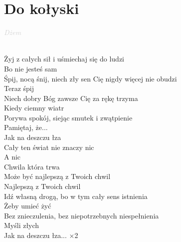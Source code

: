 \documentclass[a5paper, 10pt]{book}
\begin{document}
\section{Do kołyski}\textcolor{lightgray}{\textit{Dżem}}\\~\\
\begin{minipage}[t]{0.7\textwidth}
  Żyj z całych sił i uśmiechaj się do ludzi\\
  Bo nie jesteś sam\\
  Śpij, nocą śnij, niech zły sen Cię nigdy więcej nie obudzi\\
  Teraz śpij\\

  Niech dobry Bóg zawsze Cię za rękę trzyma\\
  Kiedy ciemny wiatr\\
  Porywa spokój, siejąc smutek i zwątpienie\\
  Pamiętaj, że...\\

  \hspace*{5mm}Jak na deszczu łza\\
  \hspace*{5mm}Cały ten świat nie znaczy nic\\
  \hspace*{5mm}A nic\\
  \hspace*{5mm}Chwila która trwa\\
  \hspace*{5mm}Może być najlepszą z Twoich chwil\\
  \hspace*{5mm}Najlepszą z Twoich chwil\\

  Idź własną drogą, bo w tym cały sens istnienia\\
  Żeby umieć żyć\\
  Bez znieczulenia, bez niepotrzebnych niespełnienia\\
  Myśli złych\\

  \hspace*{5mm}Jak na deszczu łza... $\times$2\\

\end{minipage}
\end{document}
